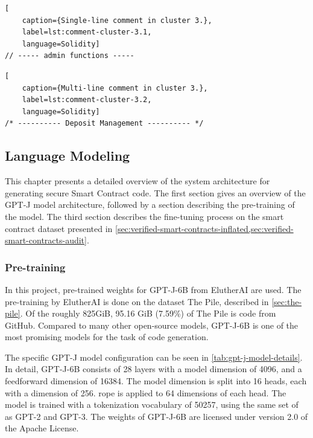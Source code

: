 \begin{lstlisting}[
    caption={Single-line comment in cluster 3.},
    label=lst:comment-cluster-3.1,
    language=Solidity]
// ----- admin functions -----
\end{lstlisting}
\begin{lstlisting}[
    caption={Multi-line comment in cluster 3.},
    label=lst:comment-cluster-3.2,
    language=Solidity]
/* ---------- Deposit Management ---------- */
\end{lstlisting}

\clearpage %

\subsection{Language Modeling}
\label{sec:language-modeling}
This chapter presents a detailed overview of the system architecture for generating secure Smart Contract code. The first section gives an overview of the GPT-J model architecture, followed by a section describing the pre-training of the model. The third section describes the fine-tuning process on the smart contract dataset presented in \cref{sec:verified-smart-contracts-inflated,sec:verified-smart-contracts-audit}. 


\subsubsection{Pre-training}
\label{sec:pretraining}
In this project, pre-trained weights for GPT-J-6B from ElutherAI are used. The pre-training by ElutherAI is done on the dataset The Pile, described in \cref{sec:the-pile}. Of the roughly 825GiB, 95.16 GiB (7.59\%) of The Pile is code from GitHub. Compared to many other open-source models, GPT-J-6B is one of the most promising models for the task of code generation.

The specific GPT-J model configuration can be seen in \cref{tab:gpt-j-model-details}. In detail, GPT-J-6B consists of 28 layers with a model dimension of 4096, and a feedforward dimension of 16384. The model dimension is split into 16 heads, each with a dimension of 256. \acrfull{rope} is applied to 64 dimensions of each head. The model is trained with a tokenization vocabulary of 50257, using the same set of  as GPT-2 and GPT-3. The weights of GPT-J-6B are licensed under version 2.0 of the Apache License.


